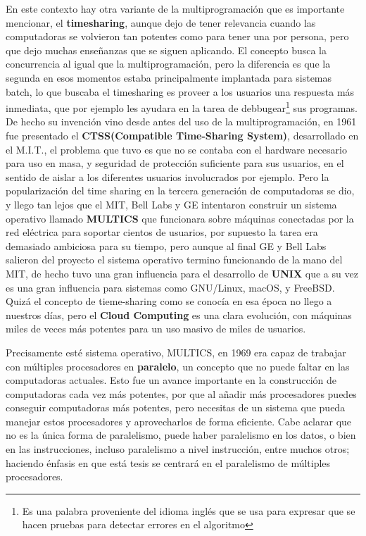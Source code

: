 \documentclass[letterpaper,12pt,oneside]{book}
\begin{document}
		En este contexto hay otra variante de la multiprogramación que es importante mencionar, el \textbf{timesharing}, aunque dejo de tener relevancia cuando
		las computadoras se volvieron tan potentes como para tener una por persona, pero que dejo muchas enseñanzas que se siguen aplicando. El concepto busca
		la concurrencia al igual que la multiprogramación, pero la diferencia es que la segunda en esos momentos estaba principalmente implantada para
		sistemas batch, lo que buscaba el timesharing es proveer a los usuarios una respuesta más inmediata, que por ejemplo les ayudara en la tarea de
	    debbugear\footnote{Es una palabra proveniente del idioma inglés que se usa para expresar que se hacen pruebas para detectar errores en el algoritmo} sus programas. 
	    De hecho su invención vino desde antes del uso de la multiprogramación, en 1961 fue presentado el \textbf{CTSS(Compatible Time-Sharing System)}, desarrollado
	    en el M.I.T., el problema que tuvo es que no se contaba con el hardware necesario para uso en masa, y seguridad de protección suficiente para sus usuarios,
	    en el sentido de aislar a los diferentes usuarios involucrados por ejemplo. Pero la popularización del time sharing en la tercera generación de computadoras
	    se dio, y llego tan lejos que el MIT, Bell Labs y GE intentaron construir un sistema operativo llamado \textbf{MULTICS} que funcionara sobre máquinas conectadas por 
	    la red eléctrica para soportar cientos de usuarios, por supuesto la tarea era demasiado ambiciosa para su tiempo, pero aunque al final GE y Bell Labs
	    salieron del proyecto el sistema operativo termino funcionando de la mano del MIT, de hecho tuvo una gran influencia para el desarrollo de \textbf{UNIX} que
	    a su vez es una gran influencia para sistemas como GNU/Linux, macOS, y FreeBSD. Quizá el concepto de tieme-sharing como se conocía en esa época no llego
	    a nuestros días, pero el \textbf{Cloud Computing} es una clara evolución, con máquinas miles de veces más potentes para un uso masivo de miles de
	    usuarios\cite{tanenbaum_modern_2002}.
		
		Precisamente esté sistema operativo, MULTICS, en 1969 era capaz de trabajar con múltiples procesadores en \textbf{paralelo}, un concepto que
		no puede faltar en las computadoras actuales\cite[p. 899]{silberschatz_operating_2009}. Esto fue un avance importante
		en la construcción de computadoras cada vez más potentes, por que al añadir más procesadores puedes conseguir computadoras más potentes, pero necesitas de un sistema 	
		que pueda manejar estos procesadores y aprovecharlos de forma eficiente. Cabe aclarar que no es la única forma de paralelismo, puede haber paralelismo en
		los datos, o bien en las instrucciones, incluso paralelismo a nivel instrucción, entre muchos otros\cite{null_mariesim_2003}; haciendo énfasis en que está tesis se 
		centrará en	el paralelismo de múltiples procesadores.
		
\end{document}
